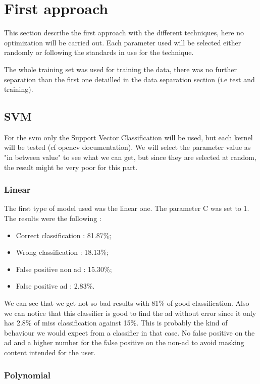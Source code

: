\section{First approach}

This section describe the first approach with the different techniques, here no optimization will be carried out. Each parameter used will be selected either randomly or following the standards in use for the technique.

The whole training set was used for training the data, there was no further separation than the first one detailled in the data separation section (i.e test and training).

\subsection{SVM}

For the svm only the Support Vector Classification will be used, but each kernel will be tested (cf opencv documentation).
We will select the parameter value as "in between value" to see what we can get, but since they are selected at random, the result might be very poor for this part.

\subsubsection{Linear}

The first type of model used was the linear one. The parameter C was set to 1. The results were the following :
\begin{itemize}
  \item Correct classification : 81.87\%;
  \item Wrong classification : 18.13\%;
  \item False positive non ad : 15.30\%;
  \item False positive ad : 2.83\%.
\end{itemize}

We can see that we get not so bad results with 81\% of good classification. Also we can notice that this classifier is good to find the ad without error since it only has 2.8\% of miss classification against 15\%. This is probably the kind of behaviour we would expect from a classifier in that case. No false positive on the ad and a higher number for the false positive on the non-ad to avoid masking content intended for the user.

\subsubsection{Polynomial}


